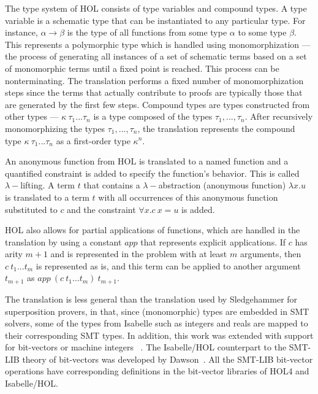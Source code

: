 \documentclass{article}
\begin{document}
		The type system of HOL consists 
		of type variables and compound types.
		A type variable is a schematic type that 
		can be instantiated to any particular type.
		For instance, $\alpha \to \beta$ is the type
		of all functions from some type $\alpha$ to
		some type $\beta$. This represents a 
		polymorphic type which is handled using 
		monomorphization --- the process of generating
		all instances of a set of schematic terms based 
		on a set of monomorphic terms until a fixed point
		is reached. This process can be nonterminating. 
		The translation performs a fixed number of 
		monomorphization steps since the terms that 
		actually contribute to proofs are 
		typically those that are generated by the 
		first few steps. Compound types 
		are types constructed from other types --- 
		$\kappa\ \tau_1 ... \tau_n$ is a type composed of 
		the types $\tau_1, ..., \tau_n$. After 
		recursively monomorphizing the types 
		$\tau_1, ..., \tau_n$, the translation 
		represents the compound type 
		$\kappa\ \tau_1 ... \tau_n$ as a first-order 
		type $\kappa^n$.
		
		An anonymous function from HOL is translated 
		to a named function and a quantified constraint
		is added to specify the function's behavior.
		This is called $\lambda-$lifting.
		A term $t$ that contains a $\lambda-$abstraction
		(anonymous function) $\lambda x.u$ is translated 
		to a term $t$ with all occurrences of this 
		anonymous function substituted to $c$ and 
		the constraint $\forall x. c\ x = u$ is added.

		HOL also allows for partial applications of 
		functions, which are handled in the translation
		by using a constant $app$ that represents 
		explicit applications. If $c$ has arity 
		$m+1$ and is represented in the problem 
		with at least $m$ arguments, then 
		$c\ t_1 ... t_m$ is represented as is, 
		and this term can be applied to another 
		argument $t_{m+1}$ as 
		$app\ (c\ t_1 ... t_m)\ t_{m+1}$.
		
		The translation is less general than the 
		translation used by Sledgehammer for 
		superposition provers, in that, since (monomorphic) 
		types are embedded in SMT solvers, some of the 
		types from Isabelle such as integers and reals 
		are mapped to their corresponding SMT types.
		In addition, this work was extended with 
		support for bit-vectors or machine integers
		~\cite{10.1007/978-3-642-25379-9_15}. The 
		Isabelle/HOL counterpart to the SMT-LIB 
		theory of bit-vectors was developed by 
		Dawson~\cite{DAWSON200955}. All the SMT-LIB
		bit-vector operations have corresponding 
		definitions in the bit-vector libraries of 
		HOL4 and Isabelle/HOL.
		
\end{document}
